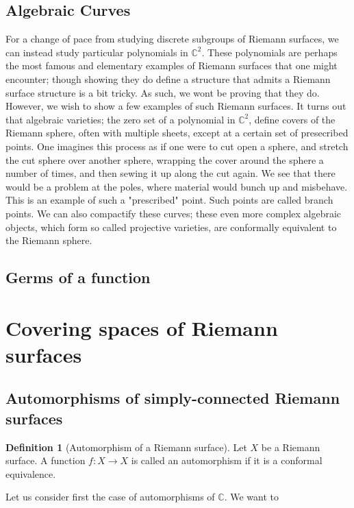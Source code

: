 \documentclass[11pt]{report}
\theoremstyle{definition}
\newtheorem{defn}[thm]{Definition}
\begin{document}
\subsection{Algebraic Curves}\label{algcurv}
For a change of pace from studying discrete subgroups of Riemann surfaces, we can instead study particular polynomials in $\mathbb{C}^2$. These polynomials are perhaps the most famous and elementary examples of Riemann surfaces that one might encounter; though showing they do define a structure that admits a Riemann surface structure is a bit tricky. As such, we wont be proving that they do. However, we wish to show a few examples of such Riemann surfaces. It turns out that algebraic varieties; the zero set of a polynomial in $\mathbb{C}^2$, define covers of the Riemann sphere, often with multiple sheets, except at a certain set of presecribed points. One imagines this process as if one were to cut open a sphere, and stretch the cut sphere over another sphere, wrapping the cover around the sphere a number of times, and then sewing it up along the cut again. We see that there would be a problem at the poles, where material would bunch up and misbehave. This is an example of such a "prescribed" point. Such points are called branch points. We can also compactify these curves; these even more complex algebraic objects, which form so called projective varieties, are conformally equivalent to the Riemann sphere.

\subsection{Germs of a function}

\section{Covering spaces of Riemann surfaces}
\subsection{Automorphisms of simply-connected Riemann surfaces}

\begin{defn}[Automorphism of a Riemann surface]
  Let $X$ be a Riemann surface. A function $f\colon X \rightarrow X$ is called an automorphism if it is a conformal equivalence.
\end{defn}

Let us consider first the case of automorphisms of $\mathbb{C}$.
We want to 
\end{document}

